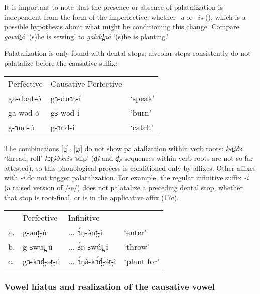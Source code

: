 It is important to note that the presence or absence of palatalization is independent from the form of the imperfective, whether \textit{-a} or \textit{-iə} (), which is a possible hypothesis about what might be conditioning this change. Compare  \textit{gawát̪á} `(s)he is sewing' to \textit{gakád̪aá} `(s)he is planting.' 

Palatalization is only found with dental stops; alveolar stops consistently do not palatalize before the causative suffix:
\ea \begin{tabular}[t]{lll}
	Perfective&	Causative Perfective & \\
ga-doat-ó	&gɜ-duɜt-í & ‘speak’\\	
ga-wəd-ó	&gɜ-wəd-í & ‘burn’	\\
	g-ɜnd-ú	&g-ɜnd-í & ‘catch’ 	\\
 \end{tabular}
\z

The combinations [t̪i], [t̪ə] do not show palatalization within verb roots: \textit{kɜt̪íðɜ} ‘thread, roll’ \textit{kɜt̪ə́ðə́niə} ‘slip’ (\textit{d̪i} and \textit{d̪ə} sequences within verb roots are not so far attested), so this phonological process is conditioned only by affixes. Other affixes with \textit{-i} do not trigger palatalization. For example, the regular infinitive suffix \textit{-i} (a raised version of /-e/) does not palatalize a preceding dental stop, whether that stop is root-final, or is in the applicative affix (17c). 

\ea \begin{tabular}[t]{llll}
	&     	Perfective	& 	Infinitive 	 & 		\\
a. 	& 	g-ənt̪-ú				& 	... ɜ́ŋ-ə́nt̪-i & 		‘enter’ \\
b. 	& 	g-ɜwut̪-ú			& ... ɜ́ŋ-ɜwút̪-i	 & 	‘throw’ \\
c.	& gɜ-kɜd̪-ət̪-ú			& ... ɜ́ŋə́-kɜ́d̪-ə́t̪-i	& 	‘plant for’\\
\end{tabular}
\z 

% 


\subsubsection{Vowel hiatus and realization of the causative vowel}\label{sec:ch11:caushiatus}

